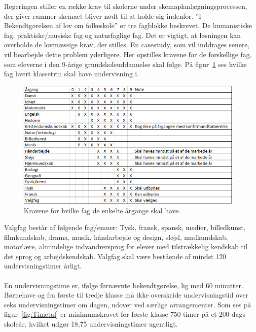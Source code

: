 Regeringen stiller en række krav til skolerne under skemaplanlægningsprocessen, der giver rammer skemaet bliver nødt til at holde sig indenfor. ''I Bekendtgørelsen af lov om folkeskole'' er tre fagblokke beskrevet. De humanistiske fag, praktiske/musiske fag og naturfaglige fag. Det er vigtigt, at løsningen kan overholde de lovmæssige krav, der stilles. En casestudy, som vil inddrages senere, vil bearbejde dette problem yderligere. Her opstilles kravene for de forskellige fag, som eleverne i den 9-årige grundskoleuddannelse skal følge. På figur~\ref{fig:Time} ses hvilke fag hvert klassetrin skal have undervisning i.

\begin{figure}[!hb]
  \centering
  \includegraphics[width=\textwidth]{partials/graphics/fagkrav.png}
  \caption{Kravene for hvilke fag de enkelte årgange skal have.}
  \label{fig:Time}
\end{figure}

Valgfag består af følgende fag/emner: Tysk, fransk, spansk, medier, billedkunst, filmkundskab, drama, musik, håndarbejde og design, sløjd, madkundskab, motorlære, almindelige indvandrersprog for elever med tilstrækkelig kendskab til det sprog og arbejdskendskab. Valgfag skal være bestående af mindst 120 undervisningstimer årligt.
\\\\
En undervisningstime er, ifølge førnævnte bekendtgørelse, lig med 60 minutter. Børnehave og fra første til tredje klasse må ikke overskride undervisningstid over seks undervisningstimer om dagen, udover ved særlige arrangementer. Som ses på figur~\ref{fig:Timetal} er minimumskravet for første klasse 750 timer på et 200 dags skoleår, hvilket udgør 18,75 undervisningstimer ugentligt.

